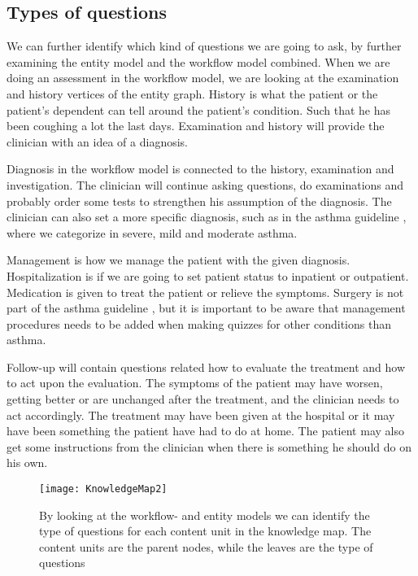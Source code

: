 \subsection{Types of questions}
We can further identify which kind of questions we are going to ask, by further examining the entity model and the workflow model combined. When we are doing an assessment in the workflow model, we are looking at the examination and history vertices of the entity graph. History is what the patient or the patient's dependent can tell around the patient's condition. Such that he has been coughing a lot the last days. Examination and history will provide the clinician with an idea of a diagnosis.

Diagnosis in the workflow model is connected to the history, examination and investigation. The clinician will continue asking questions, do examinations and probably order some tests to strengthen his assumption of the diagnosis. The clinician can also set a more specific diagnosis, such as in the asthma guideline \parencite{RepublicofKeny2016}, where we categorize in severe, mild and moderate asthma.

Management is how we manage the patient with the given diagnosis. Hospitalization is if we are going to set patient status to inpatient or outpatient. Medication is given to treat the patient or relieve the symptoms. Surgery is not part of the asthma guideline \parencite{RepublicofKeny2016}, but it is important to be aware that management procedures needs to be added when making quizzes for other conditions than asthma.

Follow-up will contain questions related how to evaluate the treatment and how to act upon the evaluation. The symptoms of the patient may have worsen, getting better or are unchanged after the treatment, and the clinician needs to act accordingly. The treatment may have been given at the hospital or it may have been something the patient have had to do at home. The patient may also get some instructions from the clinician when there is something he should do on his own. 
\begin{figure}[h!]
	\caption {By looking at the workflow- and entity models we can identify the type of questions for each content unit in the knowledge map. The content units are the parent nodes, while the leaves are the type of questions}
	\label{fig:ExpandedKnowledgeMap}
	\texttt{[image: KnowledgeMap2]}
\end{figure}

